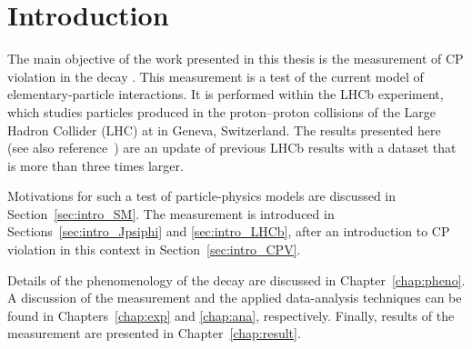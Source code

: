 \chapter{Introduction}
\label{chap:intro}

The main objective of the work presented in this thesis is the measurement of CP violation in the decay \BstoJpsiphi. This measurement is a
test of the current model of elementary-particle interactions. It is performed within the LHCb experiment, which studies particles produced
in the proton--proton collisions of the Large Hadron Collider (LHC) at \cern{} in Geneva, Switzerland. The results presented here (see also
reference~\cite{LHCb-PAPER-2014,*LHCb-ANA-2014-039}) are an update of previous LHCb results \cite{LHCb-PAPER-2013-002,*LHCb-ANA-2012-067}
with a dataset that is more than three times larger.

Motivations for such a test of particle-physics models are discussed in Section~\ref{sec:intro_SM}. The measurement is introduced in
Sections~\ref{sec:intro_Jpsiphi} and \ref{sec:intro_LHCb}, after an introduction to CP violation in this context in
Section~\ref{sec:intro_CPV}.

Details of the phenomenology of the \BstoJpsiphi{} decay are discussed in Chapter~\ref{chap:pheno}. A discussion of the  measurement and
the applied data-analysis techniques can be found in Chapters~\ref{chap:exp} and \ref{chap:ana}, respectively. Finally, results of the
measurement are presented in Chapter~\ref{chap:result}.





